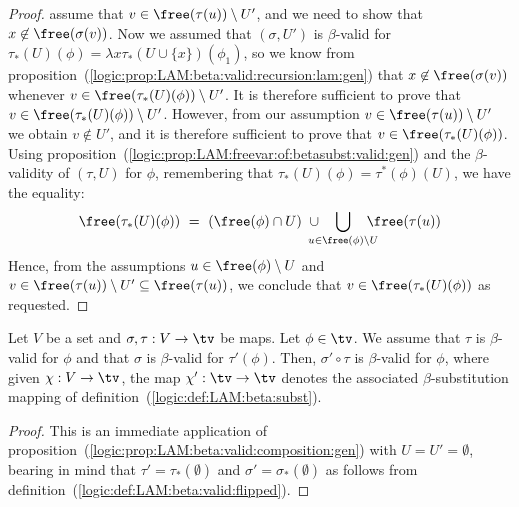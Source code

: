 \begin{proof}
    assume that $v\in\free(\tau(u))\setminus U'$, and we need to show that
    $x\not\in\free(\sigma(v))$. Now we assumed that $(\sigma,U')$ is 
    $\beta$-valid for $\tau_{*}(U)(\phi)=\lambda x\tau_{*}(U\cup \{x\})
    (\phi_{1})$, so we know from 
    proposition~(\ref{logic:prop:LAM:beta:valid:recursion:lam:gen})
    that $x\not\in\free(\sigma(v))$ whenever $v\in\free(\tau_{*}(U)(\phi))
    \setminus U'$. It is therefore sufficient to prove that $v\in\free(
    \tau_{*}(U)(\phi))\setminus U'$. However, from our assumption
    $v\in\free(\tau(u))\setminus U'$ we obtain $v\not\in U'$, and it
    is therefore sufficient to prove that $v\in\free(\tau_{*}(U)(\phi))$.
    Using proposition~(\ref{logic:prop:LAM:freevar:of:betasubst:valid:gen})
    and the $\beta$-validity of $(\tau,U)$ for $\phi$, remembering that
    $\tau_{*}(U)(\phi)=\tau^{*}(\phi)(U)$, we have the equality:
        \[
            \free(\tau_{*}(U)(\phi)) 
                \ =\ 
            (\free(\phi)\cap U)
            \ \cup
            \!\!\!\!\!\!
            \bigcup_{u\in\free(\phi)\setminus U} 
            \!\!\!\!\!\!
            \free(\tau(u))
        \]
    Hence, from the assumptions $u\in\free(\phi)\setminus U$ and 
    $v\in\free(\tau(u))\setminus U'\subseteq\free(\tau(u))$, we
    conclude that $v\in\free(\tau_{*}(U)(\phi))$ as requested.
\end{proof}

\begin{prop}\label{logic:prop:LAM:beta:valid:composition}
    Let $V$ be a set and $\sigma,\tau:V\to\tv$ be maps. Let $\phi\in\tv$.
    We assume that $\tau$ is $\beta$-valid for $\phi$
    and that $\sigma$ is $\beta$-valid for $\tau'(\phi)$.
    Then, $\sigma'\circ\tau$ is $\beta$-valid for $\phi$,
    where given $\chi:V\to\tv$, the map $\chi':\tv\to\tv$ denotes the 
    associated $\beta$-substitution mapping of 
    definition~(\ref{logic:def:LAM:beta:subst}).
\end{prop}
\begin{proof}
    This is an immediate application of
    proposition~(\ref{logic:prop:LAM:beta:valid:composition:gen}) with
    $U=U'=\emptyset$, bearing in mind that $\tau'=\tau_{*}(\emptyset)$ 
    and $\sigma'=\sigma_{*}(\emptyset)$ as follows from 
    definition~(\ref{logic:def:LAM:beta:valid:flipped}).
\end{proof}
